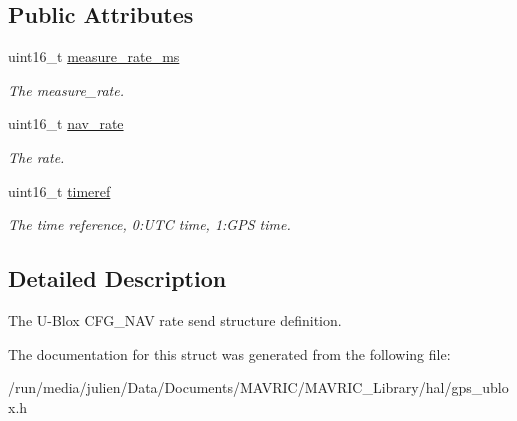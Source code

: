 \subsection*{Public Attributes}
\begin{DoxyCompactItemize}
\item 
\hypertarget{structubx__cfg__nav__rate__send__t_ae49e9d6377033f56330a6996558c2b3c}{uint16\+\_\+t \hyperlink{structubx__cfg__nav__rate__send__t_ae49e9d6377033f56330a6996558c2b3c}{measure\+\_\+rate\+\_\+ms}}\label{structubx__cfg__nav__rate__send__t_ae49e9d6377033f56330a6996558c2b3c}

\begin{DoxyCompactList}\small\item\em The measure\+\_\+rate. \end{DoxyCompactList}\item 
\hypertarget{structubx__cfg__nav__rate__send__t_acc213a0e07ce19d929005c9a7ca0a6a2}{uint16\+\_\+t \hyperlink{structubx__cfg__nav__rate__send__t_acc213a0e07ce19d929005c9a7ca0a6a2}{nav\+\_\+rate}}\label{structubx__cfg__nav__rate__send__t_acc213a0e07ce19d929005c9a7ca0a6a2}

\begin{DoxyCompactList}\small\item\em The rate. \end{DoxyCompactList}\item 
\hypertarget{structubx__cfg__nav__rate__send__t_a255e62178d8ae8983514ac63995e08b4}{uint16\+\_\+t \hyperlink{structubx__cfg__nav__rate__send__t_a255e62178d8ae8983514ac63995e08b4}{timeref}}\label{structubx__cfg__nav__rate__send__t_a255e62178d8ae8983514ac63995e08b4}

\begin{DoxyCompactList}\small\item\em The time reference, 0\+:U\+T\+C time, 1\+:G\+P\+S time. \end{DoxyCompactList}\end{DoxyCompactItemize}


\subsection{Detailed Description}
The U-\/\+Blox C\+F\+G\+\_\+\+N\+A\+V rate send structure definition. 

The documentation for this struct was generated from the following file\+:\begin{DoxyCompactItemize}
\item 
/run/media/julien/\+Data/\+Documents/\+M\+A\+V\+R\+I\+C/\+M\+A\+V\+R\+I\+C\+\_\+\+Library/hal/gps\+\_\+ublox.\+h\end{DoxyCompactItemize}
